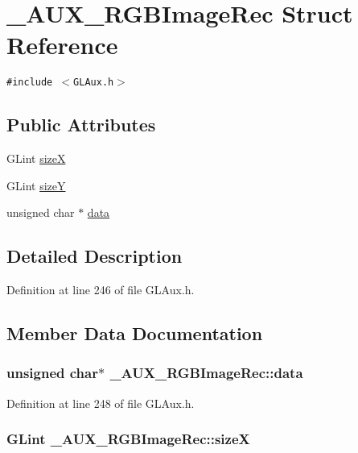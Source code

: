 \hypertarget{struct___a_u_x___r_g_b_image_rec}{
\section{\_\-AUX\_\-RGBImageRec Struct Reference}
\label{struct___a_u_x___r_g_b_image_rec}
}
{\tt \#include $<$GLAux.h$>$}

\subsection*{Public Attributes}
\begin{CompactItemize}
\item 
GLint \hyperlink{struct___a_u_x___r_g_b_image_rec_03447d1c9b4cefa9c1fc41c7dcebdcd3}{sizeX}
\item 
GLint \hyperlink{struct___a_u_x___r_g_b_image_rec_bddf60a63d1c85d73e1312f49d7b8f70}{sizeY}
\item 
unsigned char $\ast$ \hyperlink{struct___a_u_x___r_g_b_image_rec_c08e80ff1af677399e35b4620ba98bb4}{data}
\end{CompactItemize}


\subsection{Detailed Description}


Definition at line 246 of file GLAux.h.

\subsection{Member Data Documentation}
\hypertarget{struct___a_u_x___r_g_b_image_rec_c08e80ff1af677399e35b4620ba98bb4}{
\subsubsection[{data}]{\setlength{\rightskip}{0pt plus 5cm}unsigned char$\ast$ {\bf \_\-AUX\_\-RGBImageRec::data}}}
\label{struct___a_u_x___r_g_b_image_rec_c08e80ff1af677399e35b4620ba98bb4}




Definition at line 248 of file GLAux.h.\hypertarget{struct___a_u_x___r_g_b_image_rec_03447d1c9b4cefa9c1fc41c7dcebdcd3}{
\subsubsection[{sizeX}]{\setlength{\rightskip}{0pt plus 5cm}GLint {\bf \_\-AUX\_\-RGBImageRec::sizeX}}}
\label{struct___a_u_x___r_g_b_image_rec_03447d1c9b4cefa9c1fc41c7dcebdcd3}





